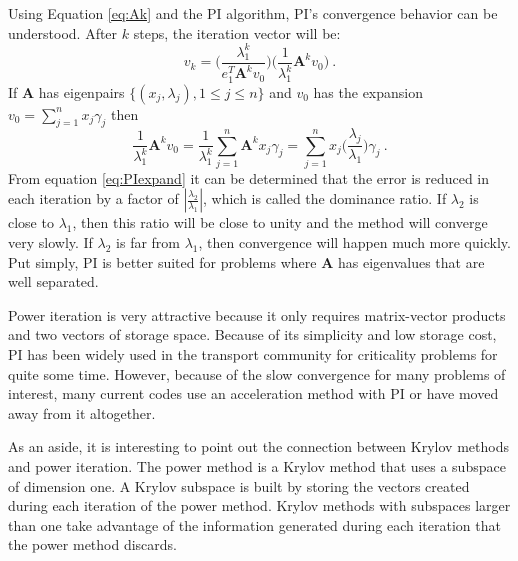 \documentclass[12pt]{article}
\newcommand{\ve}[1]{\ensuremath{\mathbf{#1}}}
\begin{document}
Using Equation \eqref{eq:Ak} and the PI algorithm, PI's convergence behavior can be understood. After $k$ steps, the iteration vector will be: 
%
\begin{equation}
  v_{k} = \bigl( \frac{\lambda_{1}^{k}}{e_{1}^{T}\ve{A}^{k}v_{0}} \bigr) \bigl(\frac{1}{\lambda_{1}^{k}}\ve{A}^{k}v_{0} \bigr) \:.
\end{equation}
% 
If $\ve{A}$ has eigenpairs $\{(x_{j}, \lambda_{j}), 1 \le j \le n \}$ and $v_{0}$ has the expansion $v_{0} = \sum_{j=1}^{n} x_{j}\gamma_{j}$ then
%
\begin{equation}
  \frac{1}{\lambda_{1}^{k}}\ve{A}^{k}v_{0} =  \frac{1}{\lambda_{1}^{k}} \sum_{j=1}^{n} \ve{A}^{k}x_{j}\gamma_{j} = \sum_{j=1}^{n} x_{j} \bigl(\frac{\lambda_{j}}{\lambda_{1}} \bigr) \gamma_{j} \:.
  \label{eq:PIexpand}
\end{equation}
%
From equation \eqref{eq:PIexpand} it can be determined that the error is reduced in each iteration by a factor of $|\frac{\lambda_{2}}{\lambda_{1}}|$, which is called the dominance ratio. If $\lambda_2$ is close to $\lambda_1$, then this ratio will be close to unity and the method will converge very slowly. If $\lambda_2$ is far from $\lambda_1$, then convergence will happen much more quickly. Put simply, PI is better suited for problems where $\ve{A}$ has eigenvalues that are well separated.%

Power iteration is very attractive because it only requires matrix-vector products and two vectors of storage space. Because of its simplicity and low storage cost, PI has been widely used in the transport community for criticality problems for quite some time. %
However, because of the slow convergence for many problems of interest, many current codes use an acceleration method with PI or have moved away from it altogether. 

As an aside, it is interesting to point out the connection between Krylov methods and power iteration. The power method is a Krylov method that uses a subspace of dimension one.  A Krylov subspace is built by storing the vectors created during each iteration of the power method. Krylov methods with subspaces larger than one take advantage of the information generated during each iteration that the power method discards. 


\end{document}
